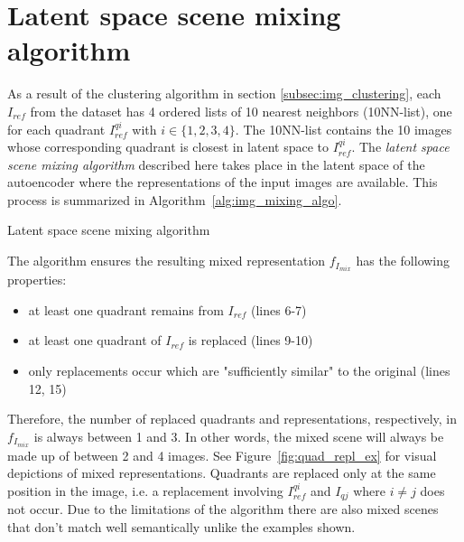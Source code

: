 \documentclass[a4paper,12pt]{report}
\begin{document}
\section{Latent space scene mixing algorithm} \label{subsec:img_mixing_algo}
As a result of the clustering algorithm in section \ref{subsec:img_clustering}, each $I_{ref}$ from the dataset has 4 ordered lists of 10 nearest neighbors (10NN-list), one for each quadrant $I^{qi}_{ref}$ with $i \in \{1,2,3,4\}$. The 10NN-list contains the 10 images whose corresponding quadrant is closest in latent space to $I^{qi}_{ref}$. The \textit{latent space scene mixing algorithm} described here takes place in the latent space of the autoencoder where the representations of the input images are available. This process is summarized in Algorithm~\ref{alg:img_mixing_algo}. 

\begin{algorithm}[H]
\DontPrintSemicolon
\LinesNumbered
{}
\caption{Latent space scene mixing algorithm}\label{alg:img_mixing_algo}
\end{algorithm}

The algorithm ensures the resulting mixed representation $f_{I_{mix}}$ has the following properties:
\begin{itemize}
   \item at least one quadrant remains from $I_{ref}$ (lines 6-7)
   \item at least one quadrant of $I_{ref}$ is replaced (lines 9-10)
   \item only replacements occur which are "sufficiently similar" to the original (lines 12, 15)
\end{itemize}
Therefore, the number of replaced quadrants and representations, respectively, in $f_{I_{mix}}$ is always between 1 and 3. In other words, the mixed scene will always be made up of between 2 and 4 images. See Figure~\ref{fig:quad_repl_ex} for visual depictions of mixed representations. Quadrants are replaced only at the same position in the image, i.e. a replacement involving $I^{qi}_{ref}$ and $I_{qj}$ where $i \neq j$ does not occur. Due to the limitations of the algorithm there are also mixed scenes that don't match well semantically unlike the examples shown.

\end{document}
